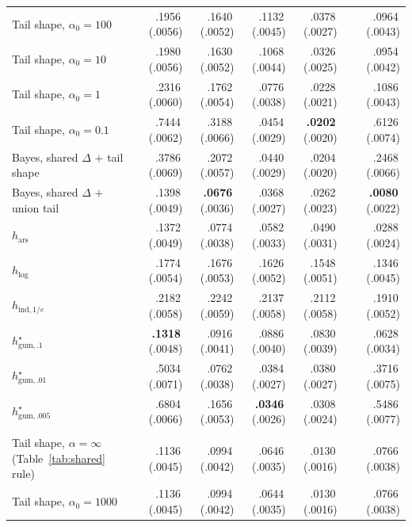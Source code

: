 \documentclass[11pt]{article}
\newcommand{\mcse}[2]{\mbox{#1\,{\fontsize{7}{8}\selectfont(#2)}}}
\newcommand{\bestmcse}[2]{\mbox{\textbf{#1}\,{\fontsize{7}{8}\selectfont(#2)}}}
\begin{document}
\begin{table}[p]
\begin{tabular}{@{}lrrrrcr@{}}
Tail shape, $\alpha_0=100$ & \mcse{.1956}{.0056} & \mcse{.1640}{.0052} & \mcse{.1132}{.0045} & \mcse{.0378}{.0027} & & \mcse{.0964}{.0043} \\
Tail shape, $\alpha_0=10$ & \mcse{.1980}{.0056} & \mcse{.1630}{.0052} & \mcse{.1068}{.0044} & \mcse{.0326}{.0025} & & \mcse{.0954}{.0042} \\
Tail shape, $\alpha_0=1$ & \mcse{.2316}{.0060} & \mcse{.1762}{.0054} & \mcse{.0776}{.0038} & \mcse{.0228}{.0021} & & \mcse{.1086}{.0043} \\
Tail shape, $\alpha_0=0.1$ & \mcse{.7444}{.0062} & \mcse{.3188}{.0066} & \mcse{.0454}{.0029} & \bestmcse{.0202}{.0020} & & \mcse{.6126}{.0074} \\
Bayes, shared $\Delta$ $+$ tail shape & \mcse{.3786}{.0069} & \mcse{.2072}{.0057} & \mcse{.0440}{.0029} & \mcse{.0204}{.0020} & & \mcse{.2468}{.0066} \\
Bayes, shared $\Delta$ $+$ union tail & \mcse{.1398}{.0049} & \bestmcse{.0676}{.0036} & \mcse{.0368}{.0027} & \mcse{.0262}{.0023} & & \bestmcse{.0080}{.0022} \\
\addlinespace[1pt]
$h_{\mathrm{ars}}$ & \mcse{.1372}{.0049} & \mcse{.0774}{.0038} & \mcse{.0582}{.0033} & \mcse{.0490}{.0031} & & \mcse{.0288}{.0024} \\
$h_{\log}$ & \mcse{.1774}{.0054} & \mcse{.1676}{.0053} & \mcse{.1626}{.0052} & \mcse{.1548}{.0051} & & \mcse{.1346}{.0045} \\
$h_{\mathrm{ind},1/e}$ & \mcse{.2182}{.0058} & \mcse{.2242}{.0059} & \mcse{.2137}{.0058} & \mcse{.2112}{.0058} & & \mcse{.1910}{.0052} \\
$h^\star_{\mathrm{gum},.1}$ & \bestmcse{.1318}{.0048} & \mcse{.0916}{.0041} & \mcse{.0886}{.0040} & \mcse{.0830}{.0039} & & \mcse{.0628}{.0034} \\
$h^\star_{\mathrm{gum},.01}$ & \mcse{.5034}{.0071} & \mcse{.0762}{.0038} & \mcse{.0384}{.0027} & \mcse{.0380}{.0027} & & \mcse{.3716}{.0075} \\
$h^\star_{\mathrm{gum},.005}$ & \mcse{.6804}{.0066} & \mcse{.1656}{.0053} & \bestmcse{.0346}{.0026} & \mcse{.0308}{.0024} & & \mcse{.5486}{.0077} \\
\addlinespace[1pt]
\multicolumn{7}{@{}l}{\textit{Horizon $n=300$}}\\
Tail shape, $\alpha=\infty$ (Table~\ref{tab:shared} rule) & \mcse{.1136}{.0045} & \mcse{.0994}{.0042} & \mcse{.0646}{.0035} & \mcse{.0130}{.0016} & & \mcse{.0766}{.0038} \\
Tail shape, $\alpha_0=1000$ & \mcse{.1136}{.0045} & \mcse{.0994}{.0042} & \mcse{.0644}{.0035} & \mcse{.0130}{.0016} & & \mcse{.0766}{.0038} \\

\end{tabular}
\end{table}
\end{document}
